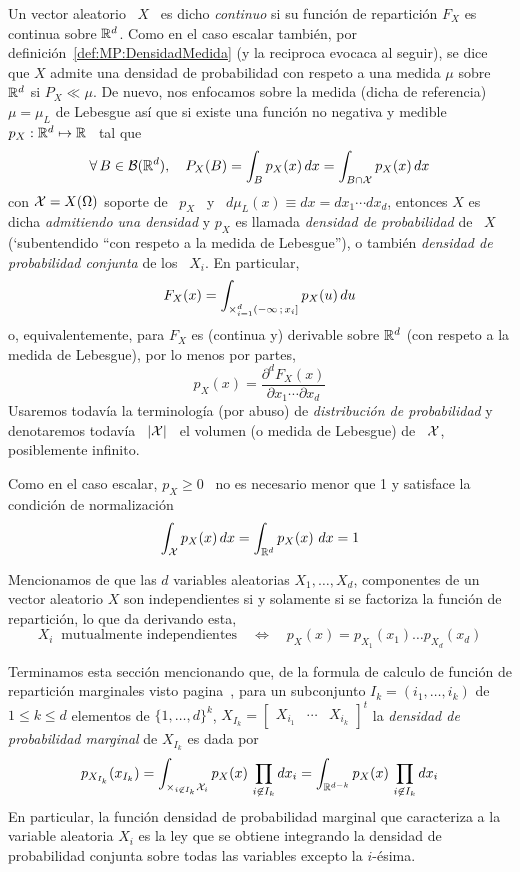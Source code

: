 \begin{definicion}
  Un  vector aleatorio  \  $X$ \  es dicho  {\it  continuo} si  su funci\'on  de
  repartici\'on  $F_X$ es  continua sobre  $\mathbb{R}^d$.  Como  en el  caso escalar
  tambi\'en,   por  definici\'on~\ref{def:MP:DensidadMedida}  (y   la  reciproca
  evocaca al  seguir), se dice que  $X$ admite una densidad  de probabilidad con
  respeto a  una medida $\mu$ sobre $\mathbb{R}^d$  si $P_X \ll \mu$.   De nuevo, nos
  enfocamos  sobre la medida  (dicha de  referencia) $\mu  = \mu_L$  de Lebesgue
  as\'i  que si  existe una  funci\'on  no negativa  y medible  \ $p_X:  \mathbb{R}^d
  \mapsto \mathbb{R}$ \ tal que
  \[
  \forall \,  B \in \mathcal{B}(\mathbb{R}^d),  \quad P_X(B) =  \int_B p_X(x) \, dx  = \int_{B
    \cap \mathcal{X}} p_X(x) \, dx
  \]
  con $\mathcal{X}  = X(\Omega)$ soporte  de \ $p_X$  \ y \  $d\mu_L(x) \equiv dx  = dx_1
  \cdots dx_d$, entonces  $X$ es dicha {\it admitiendo una  densidad} y $p_X$ es
  llamada {\it densidad de probabilidad} de \ $X$ (`subentendido ``con respeto a
  la medida de Lebesgue''), o  tambi\'en {\it densidad de probabilidad conjunta}
  de los \ $X_i$. En particular,
  \[
  F_X(x) =  \int_{\operatorname*{\times}_{i=1}^d (-\infty \, ;  \, x_i]} p_X(u) \, du
  \]
  o, equivalentemente, para $F_X$ es (continua y) derivable sobre $\mathbb{R}^d$ (con
  respeto a la medida de Lebesgue), por lo menos por partes,
  \[
  p_X(x) = \frac{\partial^d F_X(x)}{\partial x_1 \cdots \partial x_d}
  \]
  Usaremos  todav\'ia la terminolog\'ia  (por abuso)  de {\it  distribuci\'on de
    probabilidad} y  denotaremos todav\'ia  \ $|\mathcal{X}|$ \  el volumen (o  medida de
  Lebesgue) de \ $\mathcal{X}$, posiblemente infinito.
\end{definicion}

Como en el caso  escalar, $p_X \ge 0$ \ no es necesario  menor que 1 y satisface
la condici\'on de normalizaci\'on
%
\[
\int_{\mathcal{X}} p_X(x) \, dx = \int_{\mathbb{R}^d} p_X(x) \ dx  = 1
\]

Mencionamos de que las $d$  variables aleatorias $X_1, \ldots, X_d$, componentes
de un vector aleatorio $X$ son  independientes si y solamente si se factoriza la
funci\'on de repartici\'on, lo que da derivando esta,
%
\[
X_i \:  \mbox{ mutualmente independientes} \quad \Leftrightarrow  \quad p_X(x) =
p_{X_1}(x_1) \ldots p_{X_d}(x_d)
\]


Terminamos esta secci\'on mencionando que, de la formula de calculo de funci\'on
de  repartici\'on marginales visto  pagina~\pageref{pagina:MP:MarginalesF}, para
un subconjunto $I_k = (i_1,\ldots,i_k)$ de $1  \le k \le d$ elementos de $\{ 1 ,
\ldots   ,  d   \}^k$,   $X_{I_k}   =  \begin{bmatrix}   X_{i_1}   &  \cdots   &
  X_{i_k}\end{bmatrix}^t$  la   {\it  densidad  de   probabilidad  marginal}  de
$X_{I_k}$ es dada por
%
\[
p_{X_{I_k}}(x_{I_k})  = \int_{\times_{i  \not\in  I_k} \mathcal{X}_i}  p_X(x) \,  \prod_{i
    \not\in I_k}  dx_i =  \int_{\mathbb{R}^{d-k}} p_X(x) \,  \prod_{i \not\in
      I_k} dx_i
\]
%
En particular, la funci\'on densidad  de probabilidad marginal que caracteriza a
la variable aleatoria  $X_i$ es la ley que se obtiene  integrando la densidad de
probabilidad conjunta sobre todas las variables excepto la $i$-\'esima.

